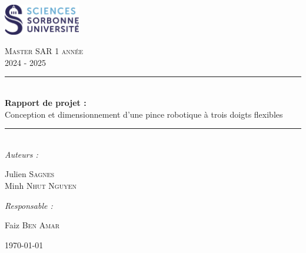 \documentclass[a4paper, 11pt]{report}
\begin{document}


\begin{titlepage}
    \newcommand{\HRule}{\rule{\linewidth}{0.5mm}}
    \begin{center}
        \begin{minipage}{1\linewidth}
            \begin{flushleft}
                \hspace{4.5cm}
                \includegraphics[width=0.25\textwidth]{Figures/SORBONNE_FAC_SCIENCES_DEF_CMJN.pdf}
            \end{flushleft}
        \end{minipage}

        \vspace{1.5cm}
        
        \textsc{\Large{}Master SAR 1 année} \\[0.5cm]
        \textsc{\large{}2024 - 2025} \\[0.5cm]

        \HRule \\[0.6cm]
        {\huge\bfseries{}Rapport de projet :} \\
        \LARGE{Conception et dimensionnement d'une pince robotique à trois doigts flexibles} \\[0.25cm]
        \HRule \\[1.5cm]


        \Large\textit{Auteurs :}\\
        \begin{center}
            Julien \textsc{Sagnes}\\
            Minh \textsc{Nhut Nguyen}
        \end{center}

        \hfill

        \Large\textit{Responsable :}\\
        \begin{center}
            Faiz \textsc{Ben Amar}
        \end{center}
        \vspace{1cm}
        {\large\today} \\[2cm]
    \end{center}

    \vfill
\end{titlepage}
\end{document}
